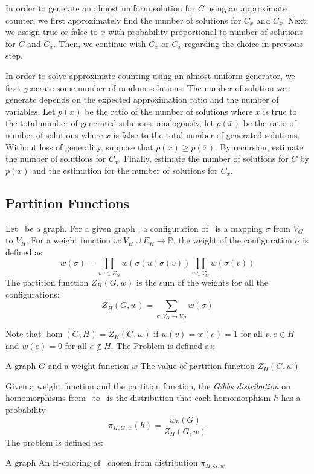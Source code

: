 In order to generate an almost uniform solution for \(C\) using an approximate counter,
we first approximately find the number of solutions for \(C_x\) and \(C_{\bar x}\)\@.
Next, we assign true or false to \(x\) with probability proportional to number of solutions 
for \(C\) and \(C_{\bar x}\)\@. Then, we continue
with \(C_x\) or \(C_{\bar x}\) regarding the choice in previous step.

In order to solve approximate counting using an almost uniform generator, we first
generate some number of random solutions. The number of solution we generate depends 
on the expected approximation ratio and the number of variables.
Let \(p(x)\) be the ratio of the number of solutions
where \(x\) is true to the total number of generated solutions; analogously, let \(p(\bar x)\) be
the ratio of number of solutions where \(x\) is false to the total number of generated solutions.
Without loss of generality, suppose that \(p(x) \ge p(\bar x)\)\@.
By recursion, estimate the number of solutions for \(C_x\). Finally, estimate 
the number of solutions for \(C\) by \(p(x)\) and the estimation for the 
number of solutions for \(C_x\)\@.

\subsection*{Partition Functions}
Let \mH\ be a graph. For a given graph \mG, a configuration of \mG\ is a mapping
\(\sigma\) from \(V_G\) to
\(V_H\). For a weight function \(w: V_H \cup E_H\to \mathbb{R}\), the weight of the configuration 
\(\sigma\) is defined as
\[w(\sigma)=\prod_{uv\in E_G}w(\sigma(u)\sigma(v))\prod_{v\in V_G}w(\sigma(v))\]
The partition function \(Z_H(G,w)\) is the sum of the weights for all the configurations:
\[Z_H(G,w)=\sum_{\sigma:V_G\to V_H}w(\sigma)\]

Note that \(\hom(G,H)=Z_{H}(G,w)\) if \(w(v)=w(e)=1\) for all \(v,e\in H\)
and \(w(e)=0\) for all \(e\not\in H\)\@. 
The  Problem is defined as:

\pnndef%
{A graph \(G\) and a weight function \(w\)}
{The value of partition function \(Z_H(G,w)\)}


Given a weight function and the partition function, 
the \emph{Gibbs distribution} on homomorphisms from \mG\ to \mH\ is
the distribution that each homomorphism \(h\) has a probability 
\[\pi_{H,G,w}(h)=\frac{w_h(G)}{Z_H(G,w)}\]
The  problem is defined as:

\pnndef%
{A graph \mG}
{An H-coloring of \mG\ chosen from distribution \(\pi_{H,G,w}\)}

